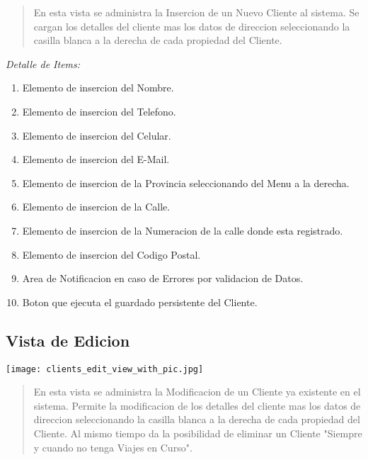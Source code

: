 \documentclass[
10pt, %
a4paper, %
oneside, %
headinclude,footinclude, %
BCOR5mm, %
]{scrartcl}
\begin{document}
 \begin{quotation}
    En esta vista se administra la Insercion de un Nuevo Cliente al sistema.
    Se cargan los detalles del cliente mas los datos de direccion seleccionando
    la casilla blanca a la derecha de cada propiedad del Cliente.
 \end{quotation}

\pagebreak

 \emph{Detalle de Items:}
 \begin{enumerate}
   \item  Elemento de insercion del Nombre.
   \item  Elemento de insercion del Telefono.
   \item  Elemento de insercion del Celular.
   \item  Elemento de insercion del E-Mail.
   \item  Elemento de insercion de la Provincia seleccionando
      del Menu a la derecha.
   \item  Elemento de insercion de la Calle.
   \item  Elemento de insercion de la Numeracion de la calle donde esta registrado.
   \item  Elemento de insercion del Codigo Postal.
   \item  Area de Notificacion en caso de Errores por validacion de Datos.
   \item  Boton que ejecuta el guardado persistente del Cliente.
  \end{enumerate}

\subsection{Vista de Edicion}
 \begin{flushleft}
     \texttt{[image: clients\_edit\_view\_with\_pic.jpg]}
 \end{flushleft}

 \begin{quotation}
    En esta vista se administra la Modificacion de un Cliente ya existente
    en el sistema. Permite la modificacion de los detalles del cliente mas los
    datos de direccion seleccionando la casilla blanca a la derecha de cada
    propiedad del Cliente.
    Al mismo tiempo da la posibilidad de eliminar un Cliente "Siempre y cuando
    no tenga Viajes en Curso".
 \end{quotation}

\pagebreak
\end{document}
